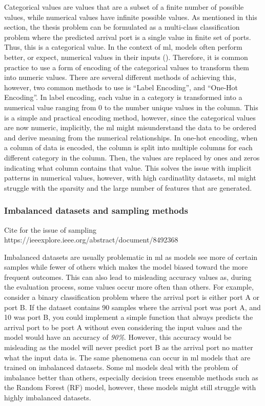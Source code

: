 Categorical values are values that are a subset of a finite number of possible values, while numerical values have infinite possible values. As mentioned in this section, the thesis problem can be formulated as a multi-class classification problem where the predicted arrival port is a single value in finite set of ports. Thus, this is a categorical value. In the context of \acrshort{ml}, models often perform better, or expect, numerical values in their inputs (). Therefore, it is common practice to use a form of encoding of the categorical values to transform them into numeric values. There are several different methods of achieving this, however, two common methods to use is ``Label Encoding'', and ``One-Hot Encoding''. In label encoding, each value in a category is transformed into a numerical value ranging from 0 to the number unique values in the column. This is a simple and practical encoding method, however, since the categorical values are now numeric, implicitly, the \acrshort{ml} might misunderstand the data to be ordered and derive meaning from the numerical relationships. In one-hot encoding, when a column of data is encoded, the column is split into multiple columns for each different category in the column. Then, the values are replaced by ones and zeros indicating what column contains that value. This solves the issue with implicit patterns in numerical values, however, with high cardinatlity datasets, \acrshort{ml} might struggle with the sparsity and the large number of features that are generated.

\subsubsection{Imbalanced datasets and sampling methods}

Cite for the issue of sampling https://ieeexplore.ieee.org/abstract/document/8492368

Imbalanced datasets are usually problematic in \acrshort{ml} as models see more of certain samples while fewer of others which makes the model biased toward the more frequent outcomes. This can also lead to misleading accuracy values as, during the evaluation process, some values occur more often than others. For example, consider a binary classification problem where the arrival port is either port A or port B. If the dataset contains 90 samples where the arrival port was port A, and 10 was port B, you could implement a simple function that always predicts the arrival port to be port A without even considering the input values and the model would have an accuracy of \textit{90\%}. However, this accuracy would be misleading as the model will never predict port B as the arrival port no matter what the input data is. The same phenomena can occur in \acrshort{ml} models that are trained on imbalanced datasets. Some \acrshort{ml} models deal with the problem of imbalance better than others, especially decision trees ensemble methods such as the Random Forest (RF) model, however, these models might still struggle with highly imbalanced datasets.

